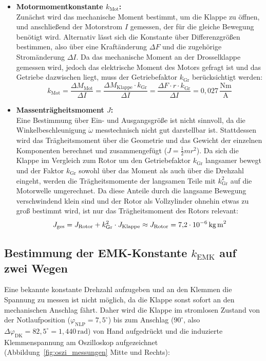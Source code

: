 \documentclass[a4paper,10pt,department=FakEI]{OTHRartcl}
\begin{document}
\begin{itemize}
    \item \textbf{Motormomentkonstante $k_{\text{Mot}}$:}\\
    Zunächst wird das mechanische Moment bestimmt, um die Klappe zu öffnen, und anschließend der Motorstrom $I$ gemessen, der für die gleiche Bewegung benötigt wird. Alternativ lässt sich die Konstante über Differenzgrößen bestimmen, also über eine Kraftänderung $\Delta F$ und die zugehörige Stromänderung $\Delta I$. Da das mechanische Moment an der Drosselklappe gemessen wird, jedoch das elektrische Moment des Motors gefragt ist und das Getriebe dazwischen liegt, muss der Getriebefaktor $k_{\text{Gr}}$ berücksichtigt werden:
    \begin{equation}
        k_{\text{Mot}} = \frac{\Delta M_{\text{Mot}}}{\Delta I} = \frac{\Delta M_{\text{Klappe}} \cdot k_{\text{Gr}}}{\Delta I} = \frac{\Delta F \cdot r \cdot k_{\text{Gr}}}{\Delta I} = 0{,}027\,\frac{\text{Nm}}{\text{A}}
    \end{equation}

    \item \textbf{Massenträgheitsmoment $J$:}\\
    Eine Bestimmung über Ein- und Ausgangsgröße ist nicht sinnvoll, da die Winkelbeschleunigung $\dot{\omega}$ messtechnisch nicht gut darstellbar ist. Stattdessen wird das Trägheitsmoment über die Geometrie und das Gewicht der einzelnen Komponenten berechnet und zusammengefügt ($J = \frac{1}{2} m r^2$). Da sich die Klappe im Vergleich zum Rotor um den Getriebefaktor $k_{\text{Gr}}$ langsamer bewegt und der Faktor $k_{\text{Gr}}$ sowohl über das Moment als auch über die Drehzahl eingeht, werden die Trägheitsmomente der langsamen Teile mit $k_{\text{Gr}}^2$ auf die Motorwelle umgerechnet. Da diese Anteile durch die langsame Bewegung verschwindend klein sind und der Rotor als Vollzylinder ohnehin etwas zu groß bestimmt wird, ist nur das Trägheitsmoment des Rotors relevant:
    \begin{equation}
        J_{\text{ges}} = J_{\text{Rotor}} + k_{\text{Gr}}^2 \cdot J_{\text{Klappe}} \approx J_{\text{Rotor}} = 7{,}2 \cdot 10^{-6}\,\text{kg\,m}^2
    \end{equation}
\end{itemize}

\subsection{Bestimmung der EMK-Konstante \texorpdfstring{$k_{\text{EMK}}$}{k\_EMK} auf zwei Wegen}
Eine bekannte konstante Drehzahl aufzugeben und an den Klemmen die Spannung zu messen ist nicht möglich, da die Klappe sonst sofort an den mechanischen Anschlag fährt. Daher wird die Klappe im stromlosen Zustand von der Notlaufposition ($\varphi_{\text{NLP}} = 7{,}5^\circ$) bis zum Anschlag ($90^\circ$, also $\Delta\varphi_{\text{DK}} = 82{,}5^\circ = 1{,}440\,\text{rad}$) von Hand aufgedrückt und die induzierte Klemmenspannung am Oszilloskop aufgezeichnet (Abbildung~\ref{fig:oszi_messungen} Mitte und Rechts):
\end{document}
